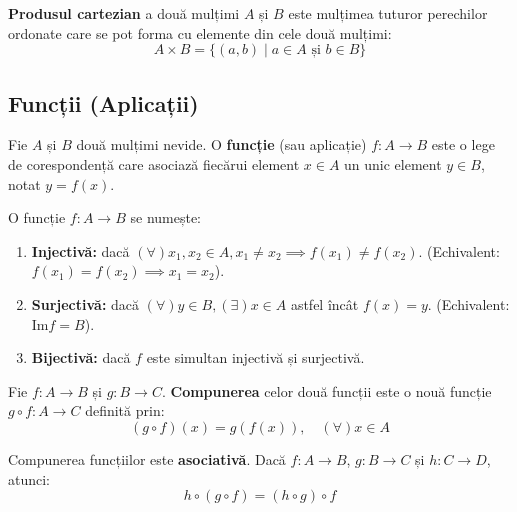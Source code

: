 \begin{definition}
\textbf{Produsul cartezian} a două mulțimi $A$ și $B$ este mulțimea tuturor perechilor ordonate care se pot forma cu elemente din cele două mulțimi:
$$ A \times B = \{(a, b) \mid a \in A \text{ și } b \in B\} $$
\end{definition}

\subsection*{Funcții (Aplicații)}

\begin{definition}
Fie $A$ și $B$ două mulțimi nevide. O \textbf{funcție} (sau aplicație) $f: A \to B$ este o lege de corespondență care asociază fiecărui element $x \in A$ un unic element $y \in B$, notat $y = f(x)$. 
\end{definition}

\begin{definition}\leavevmode
O funcție $f: A \to B$ se numește:
\begin{enumerate}
    \item \textbf{Injectivă:} dacă $(\forall) x_1, x_2 \in A, x_1 \neq x_2 \implies f(x_1) \neq f(x_2)$. (Echivalent: $f(x_1) = f(x_2) \implies x_1 = x_2$).
    \item \textbf{Surjectivă:} dacă $(\forall) y \in B, (\exists) x \in A$ astfel încât $f(x) = y$. (Echivalent: $\text{Im} f = B$).
    \item \textbf{Bijectivă:} dacă $f$ este simultan injectivă și surjectivă.
\end{enumerate}
\end{definition}

\begin{definition}
Fie $f: A \to B$ și $g: B \to C$. \textbf{Compunerea} celor două funcții este o nouă funcție $g \circ f: A \to C$ definită prin:
$$ (g \circ f)(x) = g(f(x)), \quad (\forall) x \in A $$
\end{definition}

\begin{proposition}
Compunerea funcțiilor este \textbf{asociativă}. Dacă $f: A \to B$, $g: B \to C$ și $h: C \to D$, atunci:
$$ h \circ (g \circ f) = (h \circ g) \circ f $$
\end{proposition}